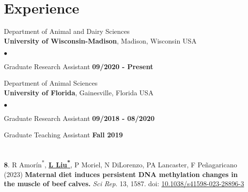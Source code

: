 \documentclass[margin,line,10pt]{res}
\newenvironment{list1}{
  \begin{list}{\ding{113}}{%
      \setlength{\itemsep}{0in}
      \setlength{\parsep}{0in} \setlength{\parskip}{0in}
      \setlength{\topsep}{0in} \setlength{\partopsep}{0in} 
      \setlength{\leftmargin}{0.17in}}}{\end{list}}
\newenvironment{list2}{
  \begin{list}{$\bullet$}{%
      \setlength{\itemsep}{0in}
      \setlength{\parsep}{0in} \setlength{\parskip}{0in}
      \setlength{\topsep}{0in} \setlength{\partopsep}{0in} 
      \setlength{\leftmargin}{0.2in}}}{\end{list}}
\begin{document}
\begin{resume}
\vspace{0.1cm}
\section{ \phantom{1cm} {\bf Experience}}
Department of Animal and Dairy Sciences\\
{\bf University of Wisconsin-Madison}, Madison, Wisconsin USA
\begin{list1}
\item[]
\begin{list2}
\vspace*{.05in}
\item Graduate Research Assistant   \hfill {\bf 09/2020 - Present}\\
\end{list2}
\vspace*{.02in}
\end{list1}

\vspace*{-.18in}
Department of Animal Sciences\\
{\bf University of Florida}, Gainesville, Florida USA
\begin{list1}
\item[]
\begin{list2}
\vspace*{.05in}
\item Graduate Research Assistant   \hfill {\bf 09/2018 - 08/2020}\\
\vspace*{-.15in}
\item Graduate Teaching Assistant   \hfill {\bf Fall 2019}\\ 
\end{list2}
\end{list1}

\vspace*{-.18in}
\section{ }
\vspace{1cm}


\section{}
\begin{list1}
\item [{\bf 8}.] R Amorín\textsuperscript{*}, \textbf{\underline{L Liu\textsuperscript{*}}}, P Moriel, N DiLorenzo, PA Lancaster, F Peñagaricano (2023) \textbf{Maternal diet induces persistent DNA methylation changes in the muscle of beef calves.} \emph{Sci Rep}. 13, 1587. doi: \textcolor{blue}{\href{https://doi.org/10.1038/s41598-023-28896-3}{10.1038/s41598-023-28896-3}}


\end{list1}
\end{resume}
\end{document}
